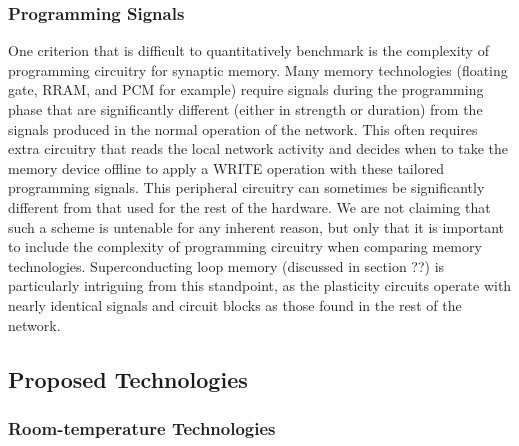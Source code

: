 \documentclass[twocolumn]{article}
\begin{document}
\subsubsection{Programming Signals}
One criterion that is difficult to quantitatively benchmark is the complexity of programming circuitry for synaptic memory. Many memory technologies (floating gate, RRAM, and PCM for example) require signals during the programming phase that are significantly different (either in strength or duration) from the signals produced in the normal operation of the network. This often requires extra circuitry that reads the local network activity and decides when to take the memory device offline to apply a WRITE operation with these tailored programming signals. This peripheral circuitry can sometimes be significantly different from that used for the rest of the hardware. We are not claiming that such a scheme is untenable for any inherent reason, but only that it is important to include the complexity of programming circuitry when comparing memory technologies. Superconducting loop memory (discussed in section ??) is particularly intriguing from this standpoint, as the plasticity circuits operate with  nearly identical signals and circuit blocks as those found in the rest of the network.

\subsection{Proposed Technologies}
\subsubsection{Room-temperature Technologies}
\end{document}
